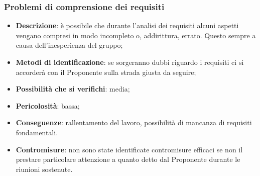 		
		\subsubsection{Problemi di comprensione dei requisiti}
		\begin{itemize}
			\item \textbf{Descrizione}: è possibile che durante l'analisi dei requisiti alcuni aspetti vengano compresi in modo incompleto o, addirittura, errato. Questo sempre a causa dell'inesperienza del gruppo;
			\item \textbf{Metodi di identificazione}: se sorgeranno dubbi riguardo i requisiti ci si accorderà con il Proponente sulla strada giusta da seguire;
			\item \textbf{Possibilità che si verifichi}: media;
			\item \textbf{Pericolosità}: bassa;
			\item \textbf{Conseguenze}: rallentamento del lavoro, possibilità di mancanza di requisiti fondamentali. 
			\item \textbf{Contromisure}: non sono state identificate contromisure efficaci se non il prestare particolare attenzione a quanto detto dal Proponente durante le riunioni sostenute.
		\end{itemize}
